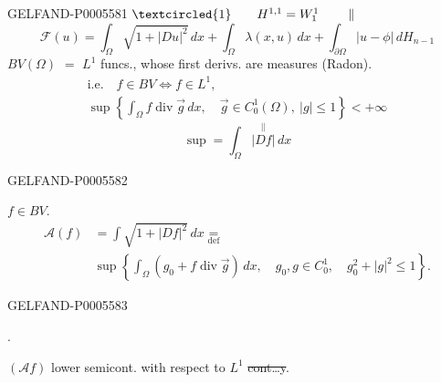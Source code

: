 \begin{GelfandAdjacentEvidence}{GELFAND-P000558}{1}
\(\textcircled{1}\qquad H^{1,1}=W_1^1\qquad\parallel\)
\[
\mathcal F(u)=\int_\Omega\sqrt{1+|Du|^2}\,dx+
\int_\Omega\lambda(x,u)\,dx+
\int_{\partial\Omega}|u-\phi|\,dH_{n-1}
\]
\(BV(\Omega)\) \(=\) \(L^1\) funcs., whose first derivs. are measures (Radon).
\[
\begin{gathered}
\text{i.e.}\quad f\in BV \iff f\in L^1,\\
\sup\left\{\int_\Omega f\operatorname{div}\vec g\,dx,\quad
\vec g\in C_0^1(\Omega),\ |g|\le1\right\}<+\infty
\end{gathered}
\]
\[
\sup=\int_\Omega \overset{\vert\vert}{|Df|}\,dx
\]
\end{GelfandAdjacentEvidence}
\begin{GelfandAdjacentEvidence}{GELFAND-P000558}{2}

\quad \underline{\(f\in BV.\)}
\[
\begin{aligned}
\mathcal A(f)&=\int\sqrt{1+|Df|^2}\,dx\underset{\mathrm{def}}{=}\\
&\sup\left\{\int_\Omega(g_0+f\operatorname{div}\vec g)\,dx,\quad
g_0,g\in C_0^1,\quad g_0^2+|g|^2\le1\right\}.
\end{aligned}
\]
\end{GelfandAdjacentEvidence}
\begin{GelfandAdjacentEvidence}{GELFAND-P000558}{3}

.

\((\mathcal A f)\) lower semicont. with respect to \(L^1\) \sout{cont\ldots y}.
\end{GelfandAdjacentEvidence}
